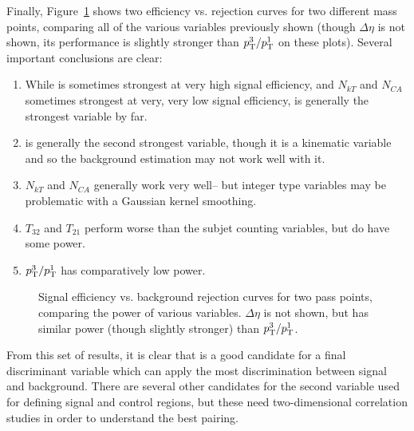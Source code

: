 
Finally, Figure~\ref{fig:search:search:optimization:All} shows two efficiency vs. rejection curves for two different mass points, comparing all of the various variables previously shown (though $\Delta \eta$ is not shown, its performance is slightly stronger than $p_{\text{T}}^3/p_{\text{T}}^1$ on these plots). Several important conclusions are clear:

\begin{enumerate}
\item While \Ht is sometimes strongest at very high signal efficiency, and $N_{kT}$ and $N_{CA}$ sometimes strongest at very, very low signal efficiency, \MJ is generally the strongest variable by far.
\item \Ht is generally the second strongest variable, though it is a kinematic variable and so the background estimation may not work well with it.
\item $N_{kT}$ and $N_{CA}$ generally work very well-- but integer type variables may be problematic with a Gaussian kernel smoothing.
\item $T_{32}$ and $T_{21}$ perform worse than the subjet counting variables, but do have some power.
\item $p_{\text{T}}^3/p_{\text{T}}^1$ has comparatively low power.
\end{enumerate}


\begin{figure}
\centering
{}
\label{fig:search:search:optimization:All}
\caption{Signal efficiency vs. background rejection curves for two pass points, comparing the power of various variables. $\Delta \eta$ is not shown, but has similar power (though slightly stronger) than $p_{\text{T}}^3 / p_{\text{T}}^1$.}
\end{figure}


From this set of results, it is clear that \MJ is a good candidate for a final discriminant variable which can apply the most discrimination between signal and background. There are several other candidates for the second variable used for defining signal and control regions, but these need two-dimensional correlation studies in order to understand the best pairing.

